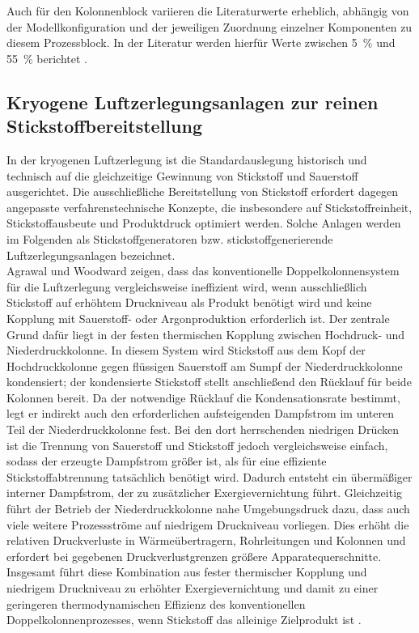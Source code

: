 Auch für den Kolonnenblock variieren die Literaturwerte erheblich, abhängig von der Modellkonfiguration und der jeweiligen Zuordnung einzelner Komponenten zu diesem Prozessblock. In der Literatur werden hierfür Werte zwischen \SI{5}{\percent} und \SI{55}{\percent} berichtet \cite{teschExergybasedMethodsApplied}.

\subsection{Kryogene Luftzerlegungsanlagen zur reinen Stickstoffbereitstellung}
\label{sec:grundlagen_stickstoff}

In der kryogenen Luftzerlegung ist die Standardauslegung historisch und technisch auf die gleichzeitige Gewinnung von Stickstoff und Sauerstoff ausgerichtet. Die ausschließliche Bereitstellung von Stickstoff erfordert dagegen angepasste verfahrenstechnische Konzepte, die insbesondere auf Stickstoffreinheit, Stickstoffausbeute und Produktdruck optimiert werden. Solche Anlagen werden im Folgenden als Stickstoffgeneratoren bzw. stickstoffgenerierende Luftzerlegungsanlagen bezeichnet.\\
Agrawal und Woodward zeigen, dass das konventionelle Doppelkolonnensystem für die Luftzerlegung vergleichsweise ineffizient wird, wenn ausschließlich Stickstoff auf erhöhtem Druckniveau als Produkt benötigt wird und keine Kopplung mit Sauerstoff- oder Argonproduktion erforderlich ist. Der zentrale Grund dafür liegt in der festen thermischen Kopplung zwischen Hochdruck- und Niederdruckkolonne. In diesem System wird Stickstoff aus dem Kopf der Hochdruckkolonne gegen flüssigen Sauerstoff am Sumpf der Niederdruckkolonne kondensiert; der kondensierte Stickstoff stellt anschließend den Rücklauf für beide Kolonnen bereit. Da der notwendige Rücklauf die Kondensationsrate bestimmt, legt er indirekt auch den erforderlichen aufsteigenden Dampfstrom im unteren Teil der Niederdruckkolonne fest. Bei den dort herrschenden niedrigen Drücken ist die Trennung von Sauerstoff und Stickstoff jedoch vergleichsweise einfach, sodass der erzeugte Dampfstrom größer ist, als für eine effiziente Stickstoffabtrennung tatsächlich benötigt wird. Dadurch entsteht ein übermäßiger interner Dampfstrom, der zu zusätzlicher Exergievernichtung führt. Gleichzeitig führt der Betrieb der Niederdruckkolonne nahe Umgebungsdruck dazu, dass auch viele weitere Prozessströme auf niedrigem Druckniveau vorliegen. Dies erhöht die relativen Druckverluste in Wärmeübertragern, Rohrleitungen und Kolonnen und erfordert bei gegebenen Druckverlustgrenzen größere Apparatequerschnitte. Insgesamt führt diese Kombination aus fester thermischer Kopplung und niedrigem Druckniveau zu erhöhter Exergievernichtung und damit zu einer geringeren thermodynamischen Effizienz des konventionellen Doppelkolonnenprozesses, wenn Stickstoff das alleinige Zielprodukt ist \cite{agrawalEfficientCryogenicNitrogen1991}.\\
